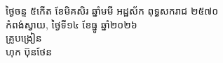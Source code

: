 \documentclass[a4paper,10pt]{article}
\begin{document}
\vspace{6pt}

\begin{flushright}
  \begin{minipage}{8.6cm}
    \centering
    ថ្ងៃចន្ទ ៥កើត ខែមិគសិរ ឆ្នាំមមី អដ្ឋស័ក ពុទ្ធសករាជ ២៥៧០\\
    កំពង់ស្វាយ, ថ្ងៃទី១៤ ខែធ្នូ ឆ្នាំ២០២៦\\[4pt]
    {\muol គ្រូបង្រៀន}\\[32pt]
    \hfill{\muol ហុក ប៊ុនថែន}\hspace*{1.4cm}
  \end{minipage}
\end{flushright}
\end{document}

